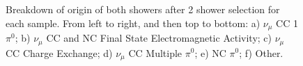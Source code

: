 \documentclass{article}
\begin{document}
\begin{figure}[H]
\caption{ Breakdown of origin of both showers after 2 shower selection for each sample.  From left to right, and then top to bottom: a) $\nu_{\mu}$ CC 1 $\pi^0$; b) $\nu_\mu$ CC and NC Final State Electromagnetic Activity; c) $\nu_{\mu}$ CC Charge Exchange; d) $\nu_\mu$ CC Multiple $\pi^0$; e) NC $\pi^0$; f) Other.  }

\label{fig:physics_showerOriginBreakdown_mass}
\end{figure}


\end{document}

